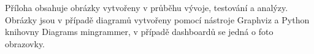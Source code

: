 
\listofappendices


Příloha obsahuje obrázky vytvořeny v průběhu vývoje, testování a analýzy. Obrázky jsou v případě diagramů vytvořeny pomocí nástroje Graphviz a Python knihovny Diagrams mingrammer, v případě dashboardů se jedná o foto obrazovky.


